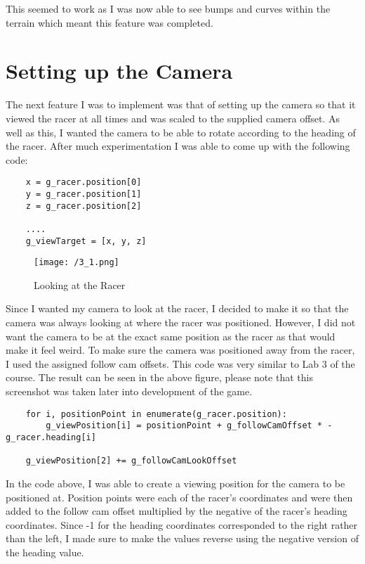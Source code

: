 \documentclass[11pt, oneside, a4paper]{article}
\begin{document}
This seemed to work as I was now able to see bumps and curves within the terrain which meant this feature was completed.

\section{Setting up the Camera}
The next feature I was to implement was that of setting up the camera so that it viewed the racer at all times and was scaled to the supplied camera offset. As well as this, I wanted the camera to be able to rotate according to the heading of the racer. After much experimentation I was able to come up with the following code:

\begin{lstlisting}  
    x = g_racer.position[0]
    y = g_racer.position[1]
    z = g_racer.position[2]

    ....
    g_viewTarget = [x, y, z]
\end{lstlisting}

\begin{figure}[!ht]
	\centerline{\texttt{[image: /3\_1.png]}}
	\caption{Looking at the Racer}
	\label{fig:figure2}
\end{figure}

Since I wanted my camera to look at the racer, I decided to make it so that the camera was always looking at where the racer was positioned. However, I did not want the camera to be at the exact same position as the racer as that would make it feel weird. To make sure the camera was positioned away from the racer, I used the assigned follow cam offsets. This code was very similar to Lab 3 of the course. The result can be seen in the above figure, please note that this screenshot was taken later into development of the game.

\begin{lstlisting}  
    for i, positionPoint in enumerate(g_racer.position): 
        g_viewPosition[i] = positionPoint + g_followCamOffset * -g_racer.heading[i]

    g_viewPosition[2] += g_followCamLookOffset
\end{lstlisting}
In the code above, I was able to create a viewing position for the camera to be positioned at. Position points were each of the racer's coordinates and were then added to the follow cam offset multiplied by the negative of the racer's heading coordinates. Since -1 for the heading coordinates corresponded to the right rather than the left, I made sure to make the values reverse using the negative version of the heading value.
\end{document}
